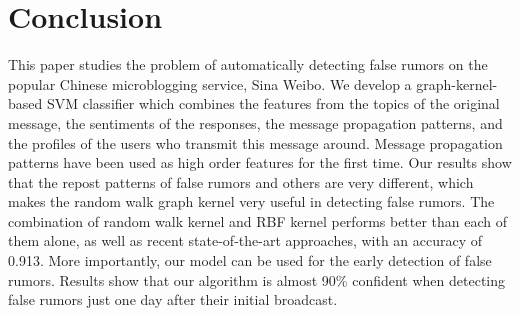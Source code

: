 \section{Conclusion}
This paper studies the problem of automatically detecting false rumors on 
the popular Chinese microblogging service, Sina Weibo. 
We develop a graph-kernel-based SVM
classifier which combines the features from the topics of the original message,
the sentiments of the responses, the message propagation patterns, and the
profiles of the users who transmit this message around. Message propagation
patterns have been used as high order features for the first time.
Our results show that the repost patterns of false rumors and others are
very different, which makes the random walk graph kernel very useful
in detecting false rumors.
The combination of random walk kernel and RBF kernel performs better
than each of them alone, as well as recent state-of-the-art approaches,
with an accuracy of 0.913. More importantly, our model can be 
used for the early detection of false rumors. Results show that
our algorithm is almost 90\% confident when detecting false rumors 
just one day after their initial broadcast.

